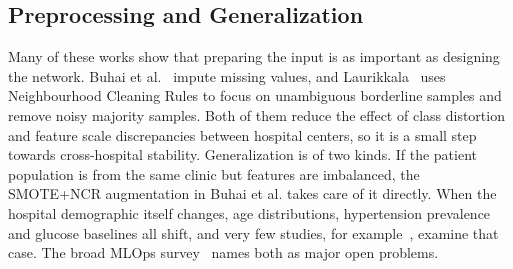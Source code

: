 \documentclass[10pt,twocolumn,a4paper]{article}
\begin{document}
\subsection{Preprocessing and Generalization}
Many of these works show that preparing the input is as important as designing the network. Buhai et al.~\cite{buhai2026} impute missing values, and Laurikkala~\cite{laurikkala2001} uses Neighbourhood Cleaning Rules to focus on unambiguous borderline samples and remove noisy majority samples. Both of them reduce the effect of class distortion and feature scale discrepancies between hospital centers, so it is a small step towards cross-hospital stability. Generalization is of two kinds. If the patient population is from the same clinic but features are imbalanced, the SMOTE+NCR augmentation in Buhai et al. takes care of it directly. When the hospital demographic itself changes, age distributions, hypertension prevalence and glucose baselines all shift, and very few studies, for example~\cite{chowdary2022}, examine that case. The broad MLOps survey~\cite{paleyes2022} names both as major open problems.
\end{document}
